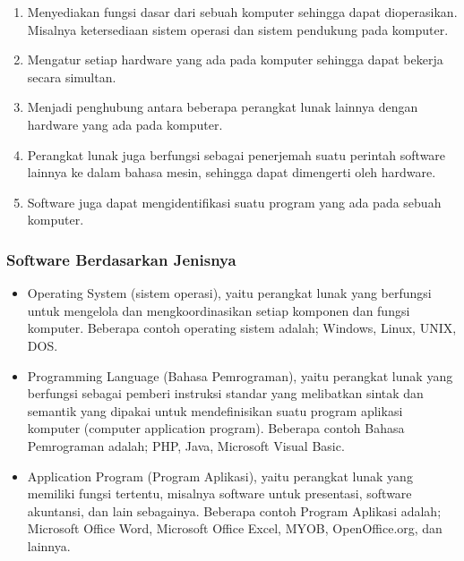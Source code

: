 \begin{enumerate}
\item Menyediakan fungsi dasar dari sebuah komputer sehingga dapat dioperasikan. Misalnya ketersediaan sistem operasi dan sistem pendukung pada komputer.

\item Mengatur setiap hardware yang ada pada komputer sehingga dapat bekerja secara simultan.

\item Menjadi penghubung antara beberapa perangkat lunak lainnya dengan hardware yang ada pada komputer.

\item Perangkat lunak juga berfungsi sebagai penerjemah suatu perintah software lainnya ke dalam bahasa mesin, sehingga dapat dimengerti oleh hardware.

\item Software juga dapat mengidentifikasi suatu program yang ada pada sebuah komputer.
\end{enumerate}

\subsubsection{Software Berdasarkan Jenisnya}

\begin{itemize}

\item Operating System (sistem operasi), yaitu perangkat lunak yang berfungsi untuk mengelola dan mengkoordinasikan setiap komponen dan fungsi komputer. Beberapa contoh operating sistem adalah; Windows, Linux, UNIX, DOS.

\item Programming Language (Bahasa Pemrograman), yaitu perangkat lunak yang berfungsi sebagai pemberi instruksi standar yang melibatkan sintak dan semantik yang dipakai untuk mendefinisikan suatu program aplikasi komputer (computer application program). Beberapa contoh Bahasa Pemrograman adalah; PHP, Java, Microsoft Visual Basic.

\item Application Program (Program Aplikasi), yaitu perangkat lunak yang memiliki fungsi tertentu, misalnya software untuk presentasi, software akuntansi, dan lain sebagainya. Beberapa contoh Program Aplikasi adalah; Microsoft Office Word, Microsoft Office Excel, MYOB, OpenOffice.org, dan lainnya.
\end{itemize}

